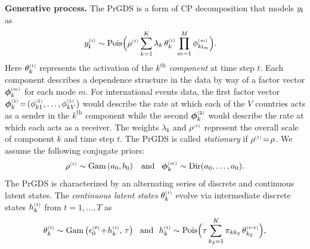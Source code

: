 \documentclass{article}
\begin{document}
\textbf{Generative process.} The PrGDS is a form of CP decomposition \cite{harshman1970foundations} that models $y_{\textbf{\textrm{i}}}$ as
\begin{align}
\label{eq:tensor_likelihood}
\ydt &\sim \textrm{Pois}\Big(\rhot \sum_{k = 1}^K \lambda_k \, \thetakt \prod_{m=1}^M \phi^{\mathsmaller{(m)}}_{k \osub_m}\Big).
\end{align}
Here $\thetakt$ represents the activation of the $k^{\textrm{th}}$ \emph{component} at time step $t$. Each component describes a dependence structure in the data by way of a factor vector $\boldsymbol{\phi}^{\mathsmaller{(m)}}_{k}$ for each mode $m$. For international events data, the first factor vector $\boldsymbol{\phi}^{\mathsmaller{(1)}}_{k} \teq (\phi^{\mathsmaller{(1)}}_{k1},\dots,\phi^{\mathsmaller{(1)}}_{kV})$ would describe the rate at which each of the $V$ countries acts as a sender in the $k^{\textrm{th}}$ component while the second $\boldsymbol{\phi}^{\mathsmaller{(2)}}_{k}$ would describe the rate at which each acts as a receiver. The weights $\lambda_k$ and $\rho^{\mathsmaller{(t)}}$ represent the overall scale of component $k$ and time step $t$. The PrGDS is called \emph{stationary} if $\rhot \teq \rho$. We assume the following conjugate priors:~
\begin{equation}
\rhot \sim \Gam{a_0, b_0} \,\,\,\textrm{ and }\,\,\, \boldsymbol{\phi}^{\mathsmaller{(m)}}_k \sim \textrm{Dir}(a_0,\dots,a_0).
\end{equation}
The PrGDS is characterized by an alternating series of discrete and continuous latent states. The \emph{continuous latent states} $\thetakt$ evolve via intermediate discrete states $\hkt$ from $t=1,\dots,T$ as~
\begin{equation}
\label{eq:thetaktandhkt}
\thetakt \sim \Gam{\epstheta \tp \hkt,\, \tau} \,\,\textrm{ and }\,\, \hkt \sim \textrm{Pois}\Big(\tau \sum_{k_2 = 1}^K \pi_{kk_2} \,\thetakttm\Big),
\end{equation}
\end{document}
